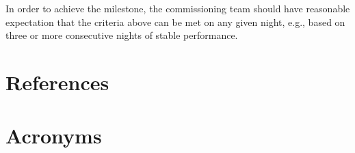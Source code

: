 \documentclass[SE,authoryear,toc,lsstdraft]{lsstdoc}
\begin{document}
In order to achieve the milestone, the commissioning team should have reasonable expectation that the criteria above can be met on any given night, e.g., based on three or more consecutive nights of stable performance.


\appendix
\section{References} \label{sec:bib}
\renewcommand{\refname}{} %


\section{Acronyms} \label{sec:acronyms}

\end{document}
